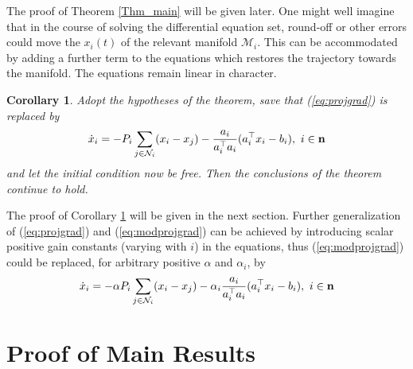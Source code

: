 \documentclass{aims}
\newtheorem{cor}{\textbf{Corollary}}
\def\n{{\bf n}}
\begin{document}
The proof of Theorem \ref{Thm_main} will be given later. One might well imagine that in the course of solving the differential equation set, round-off or other errors could move the $x_i(t)$ of the relevant manifold $\mathcal M_i$. This can be accommodated by adding a further term to the equations which restores the trajectory towards the manifold. The equations remain linear in character.

\begin{cor}\label{Cor_1}
Adopt the hypotheses of the theorem, save that (\ref{eq:projgrad}) is replaced by
\begin{equation}\label{eq:modprojgrad}
\dot x_i=-P_i\sum_{j\in \mathcal N_i}(x_i-x_j)-\frac{a_i}{a_i^{\top}a_i}(a_i^{\top}x_i-b_i),\ i\in \n
\end{equation}
and let the initial condition now be free. Then the conclusions of the theorem continue to hold.
\end{cor}

The proof of Corollary \ref{Cor_1} will be given in the next section. Further generalization of (\ref{eq:projgrad}) and (\ref{eq:modprojgrad}) can be achieved by introducing scalar positive gain constants (varying with $i$) in the equations, thus (\ref{eq:modprojgrad}) could be replaced, for arbitrary positive $\alpha$ and $\alpha_i$, by
\begin{equation}\label{eq:doublemodprojgrad}
\dot x_i=-\alpha P_i\sum_{j\in \mathcal N_i}(x_i-x_j)-\alpha_i\frac{a_i}{a_i^{\top}a_i}(a_i^{\top}x_i-b_i), \ i\in \n
\end{equation}





\section{Proof of Main Results}
\end{document}
